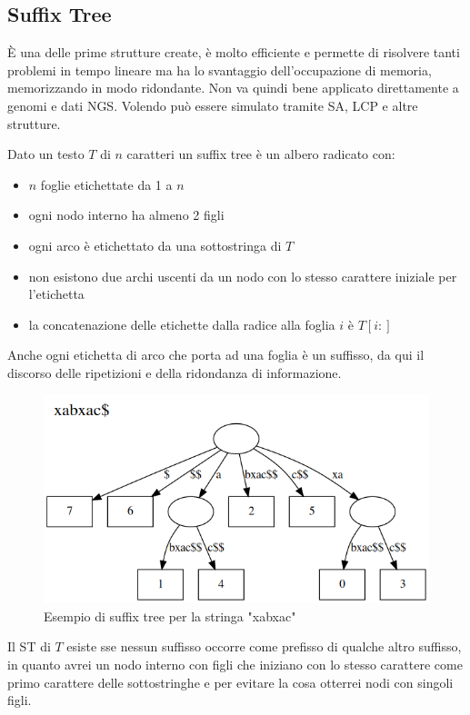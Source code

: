 \documentclass[a4paper,12pt, oneside]{book}
\begin{document}
\subsection{Suffix Tree}
È una delle prime strutture create, è molto efficiente e permette di risolvere
tanti problemi in tempo lineare ma ha lo svantaggio dell'occupazione di
memoria, memorizzando in modo ridondante. Non va quindi bene applicato
direttamente a genomi e dati NGS. Volendo può essere simulato tramite SA, LCP e
altre strutture.
\begin{definizione}
  Dato un testo $T$ di $n$ caratteri un suffix tree è un albero radicato con:
  \begin{itemize}
    \item $n$ foglie etichettate da 1 a $n$
    \item ogni nodo interno ha almeno 2 figli
    \item ogni arco è etichettato da una sottostringa di $T$
    \item non esistono due archi uscenti da un nodo con lo stesso carattere
    iniziale per l'etichetta
    \item la concatenazione delle etichette dalla radice alla foglia $i$
    è $T[i:]$ 
  \end{itemize}
  \textup{Anche ogni etichetta di arco che porta ad una foglia è un suffisso},
  da qui il discorso delle ripetizioni e della ridondanza di informazione.
\end{definizione}
\begin{figure}
  \centering
  \includegraphics[scale = 0.5]{img/st.png}
  \caption{Esempio di suffix tree per la stringa "xabxac"}
\end{figure}
\begin{teorema}
  Il ST di $T$ esiste sse nessun suffisso occorre come prefisso di qualche altro
  suffisso, in quanto avrei un nodo interno con figli che iniziano con lo stesso
  carattere come primo carattere delle sottostringhe e per evitare la cosa
  otterrei nodi con singoli figli. 
\end{teorema}
\end{document}

